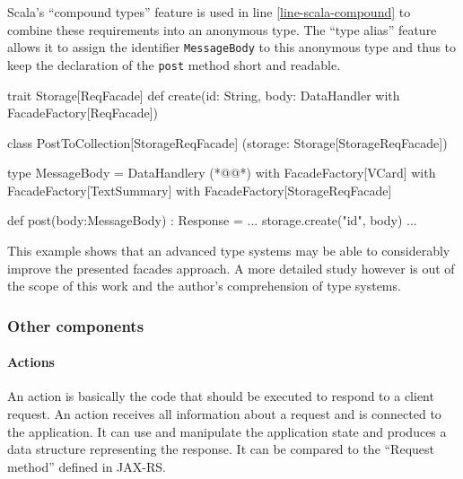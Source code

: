 \documentclass[12pt,a4paper]{scrartcl}		%
\begin{document}
Scala's ``compound types'' feature is used in line \ref{line-scala-compound} to
combine these requirements into an anonymous type. The ``type alias'' feature
allows it to assign the identifier \lstinline:MessageBody: to this anonymous
type and thus to keep the declaration of the \lstinline:post: method short and
readable.

\begin{javalisting}[label=fig:facades-with-scala-types,
                   numbers=left,
                   escapeinside={(*@}{@*)},
                   caption={Implementing the facades approach with Scala's type system}]
trait Storage[ReqFacade] {
 def create(id: String,
            body: DataHandler with FacadeFactory[ReqFacade])
}

class PostToCollection[StorageReqFacade]
            (storage: Storage[StorageReqFacade]) {
 type MessageBody = DataHandlery (*@\label{line-scala-compound}@*)
                      with FacadeFactory[VCard] 
                      with FacadeFactory[TextSummary]
                      with FacadeFactory[StorageReqFacade]
  
 def post(body:MessageBody) : Response = {
  ...
  storage.create("id", body)
  ...
 }
}
\end{javalisting}

This example shows that an advanced type systems may be able to considerably
improve the presented facades approach. A more detailed study however is out of
the scope of this work and the author's comprehension of type systems.

\subsubsection{Other components}

\paragraph{Actions}
\label{sec:components-actions}

An action is basically the code that should be executed to respond to a client
request. An action receives all information about a request and is connected to
the application. It can use and manipulate the application state and produces a
data structure representing the response. It can be compared to the ``Request
method'' defined in JAX-RS.

\end{document}

